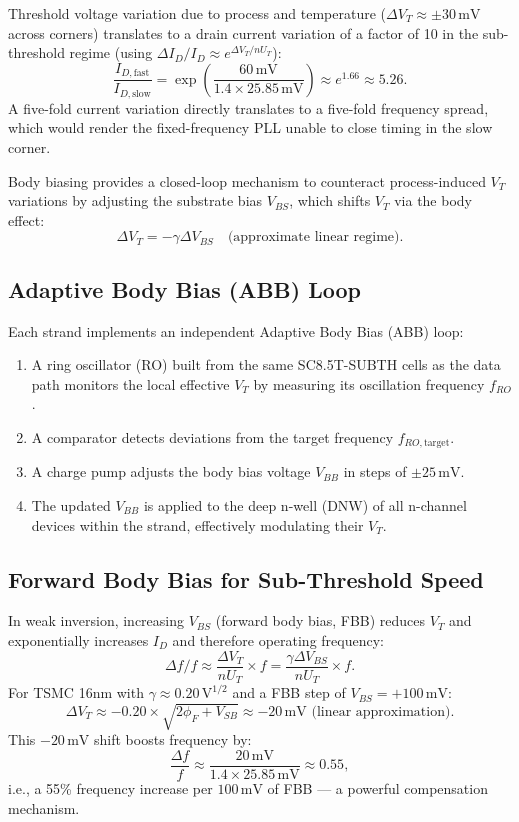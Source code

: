 Threshold voltage variation due to process and temperature ($\Delta V_T \approx \pm 30\,\text{mV}$
across corners) translates to a drain current variation of a factor of 10 in the
sub-threshold regime (using $\Delta I_D / I_D \approx e^{\Delta V_T / n U_T}$):
\[
  \frac{I_{D,\text{fast}}}{I_{D,\text{slow}}} =
  \exp\!\left(\frac{60\,\text{mV}}{1.4 \times 25.85\,\text{mV}}\right)
  \approx e^{1.66} \approx 5.26.
\]
A five-fold current variation directly translates to a five-fold frequency spread, which
would render the fixed-frequency PLL unable to close timing in the slow corner.

Body biasing provides a closed-loop mechanism to counteract process-induced $V_T$ variations
by adjusting the substrate bias $V_{BS}$, which shifts $V_T$ via the body effect:
\[
  \Delta V_T = -\gamma \Delta V_{BS} \quad \text{(approximate linear regime)}.
\]

\subsection{Adaptive Body Bias (ABB) Loop}

Each strand implements an independent Adaptive Body Bias (ABB) loop:
\begin{enumerate}
  \item A ring oscillator (RO) built from the same SC8.5T-SUBTH cells as the data path
        monitors the local effective $V_T$ by measuring its oscillation frequency $f_{RO}$.
  \item A comparator detects deviations from the target frequency $f_{RO,\text{target}}$.
  \item A charge pump adjusts the body bias voltage $V_{BB}$ in steps of $\pm 25\,\text{mV}$.
  \item The updated $V_{BB}$ is applied to the deep n-well (DNW) of all n-channel devices
        within the strand, effectively modulating their $V_T$.
\end{enumerate}

\subsection{Forward Body Bias for Sub-Threshold Speed}

In weak inversion, increasing $V_{BS}$ (forward body bias, FBB) reduces $V_T$ and
exponentially increases $I_D$ and therefore operating frequency:
\[
  \Delta f / f \approx \frac{\Delta V_T}{n U_T} \times f = \frac{\gamma \Delta V_{BS}}{n U_T} \times f.
\]
For TSMC 16nm with $\gamma \approx 0.20\,\text{V}^{1/2}$ and a FBB step of
$V_{BS} = +100\,\text{mV}$:
\[
  \Delta V_T \approx -0.20 \times \sqrt{2\phi_F + V_{SB}} \approx -20\,\text{mV} \text{ (linear approximation)}.
\]
This $-20\,\text{mV}$ shift boosts frequency by:
\[
  \frac{\Delta f}{f} \approx \frac{20\,\text{mV}}{1.4 \times 25.85\,\text{mV}} \approx 0.55,
\]
i.e., a 55\% frequency increase per $100\,\text{mV}$ of FBB — a powerful compensation
mechanism.

